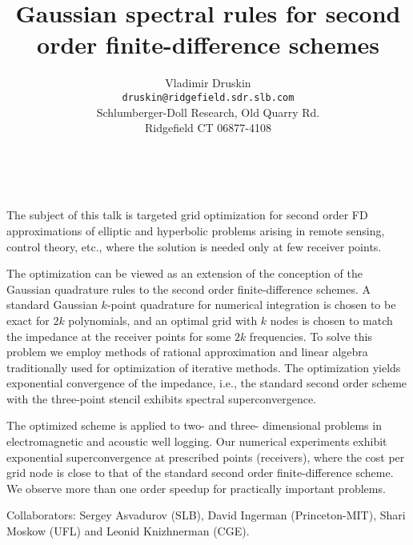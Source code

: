 \documentclass[11pt]{article}
\date{ ~ \hspace{-4mm}}
\title{Gaussian spectral rules for second order finite-difference schemes  }
\author{Vladimir Druskin \\ {\tt druskin@ridgefield.sdr.slb.com} \\ Schlumberger-Doll Research, Old Quarry Rd. \\ Ridgefield CT 06877-4108}
\begin{document}
\maketitle
\thispagestyle{empty}





 



The subject of this talk is  targeted grid optimization  for second order 
FD approximations of elliptic and hyperbolic problems arising in remote 
sensing, control theory, etc., where the solution is needed only at few 
receiver points.

The optimization can be viewed as an extension of the conception of the 
Gaussian quadrature rules to the second order finite-difference schemes.  A 
standard Gaussian $k$-point quadrature for numerical integration is chosen to 
be exact for  $2k$ polynomials, and an optimal grid with $k$ nodes  is chosen 
to match the impedance at the receiver points for some $2k$ frequencies. To 
solve this problem we employ  methods of rational approximation and linear 
algebra traditionally used for optimization of iterative methods. The 
optimization yields   exponential convergence of the impedance, i.e., the 
standard second order scheme with the three-point stencil exhibits spectral 
superconvergence.

The optimized scheme is applied to  two- and three- dimensional  problems 
in electromagnetic and acoustic well logging. Our numerical experiments 
exhibit  exponential superconvergence at prescribed points (receivers), 
where the cost per grid node is close to that of the  standard second order 
finite-difference scheme. We observe more than one order speedup for 
practically important problems.

Collaborators: Sergey Asvadurov (SLB), David Ingerman (Princeton-MIT), 
Shari Moskow (UFL) and Leonid Knizhnerman (CGE).
\end{document}
